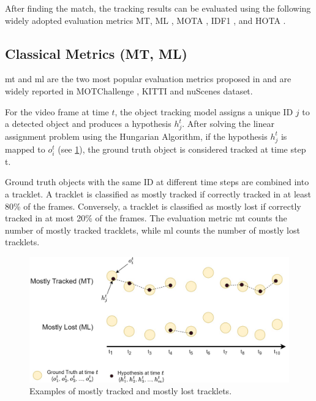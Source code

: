 After finding the match, the tracking results can be evaluated using the following widely adopted evaluation metrics MT, ML \citep{wu2006tracking}, MOTA \citep{bernardin2008evaluating}, IDF1 \citep{ristani2016performance}, and HOTA \citep{luiten2021hota}.

\subsection{Classical Metrics (MT, ML)}

\acrfull{mt} and \acrfull{ml} are the two most popular evaluation metrics proposed in \citep{wu2006tracking} and are widely reported in MOTChallenge \citep{dendorfer2020mot20}, KITTI \citep{Geiger2012CVPR} and nuScenes \citep{caesar2020nuscenes} dataset.

For the video frame at time $t$, the object tracking model assigns a unique ID $j$ to a detected object and produces a hypothesis $h_j^t$. After solving the linear assignment problem using the Hungarian Algorithm, if the hypothesis $h_j^t$ is mapped to $o_i^t$ (see \ref{fig:mt_ml}), the ground truth object is considered tracked at time step t.

Ground truth objects with the same ID at different time steps are combined into a tracklet. A tracklet is classified as mostly tracked if correctly tracked in at least 80\% of the frames. Conversely, a tracklet is classified as mostly lost if correctly tracked in at most 20\% of the frames. The evaluation metric \acrshort{mt} counts the number of mostly tracked tracklets, while \acrshort{ml} counts the number of mostly lost tracklets.

\begin{figure}[H]
    \centering
    \includegraphics[width=\linewidth]{figures/chapter_tracking/MT_ML.jpg}
  \caption{Examples of mostly tracked and mostly lost tracklets.}
  \label{fig:mt_ml}
\end{figure}


